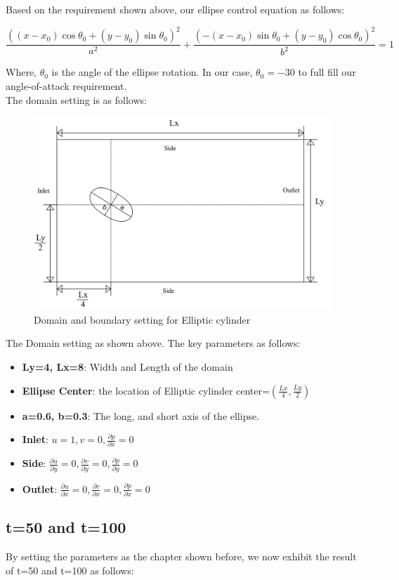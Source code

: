 \documentclass[12pt]{article}
\begin{document}
Based on the requirement shown above, our ellipse control equation as follows:

$$
\frac{((x-x_0)\cos{\theta_0}+(y-y_0)\sin{\theta_0})^2}{a^2}+
\frac{(-(x-x_0)\sin{\theta_0}+(y-y_0)\cos{\theta_0})^2}{b^2} = 1
$$

Where, $\theta_0$ is the angle of the ellipse rotation. In our case, $\theta_0 = -30$ to full fill our angle-of-attack requirement.\\

The domain setting is as follows:

\begin{figure}[H]
    \centering
    \includegraphics[width=0.6\linewidth]{figure/Solver and Stting/Ellipse_Setting.jpg}
    \caption{Domain and boundary setting for Elliptic cylinder}
\end{figure}

The Domain setting as shown above. The key parameters as follows:
\begin{itemize}
    \item \textbf{Ly=4, Lx=8}: Width and Length of the domain
    \item \textbf{Ellipse Center}: the location of Elliptic cylinder center=$(\frac{Lx}{4}, \frac{Ly}{2})$
    \item  \textbf{a=0.6, b=0.3}: The long, and short axis of the ellipse.

    \item \textbf{Inlet}: $u=1, v=0, \frac{\partial p}{\partial x}=0$
    \item \textbf{Side}: $\frac{\partial u}{\partial y}=0, \frac{\partial v}{\partial y}=0, 
    \frac{\partial p}{\partial y}=0$
    \item \textbf{Outlet}: $\frac{\partial u}{\partial x}=0, \frac{\partial v}{\partial x}=0, 
    \frac{\partial p}{\partial x}=0$
\end{itemize}






\subsection{t=50 and t=100}
By setting the parameters as the chapter shown before, we now exhibit the result of t=50 and t=100 as follows:
\end{document}
